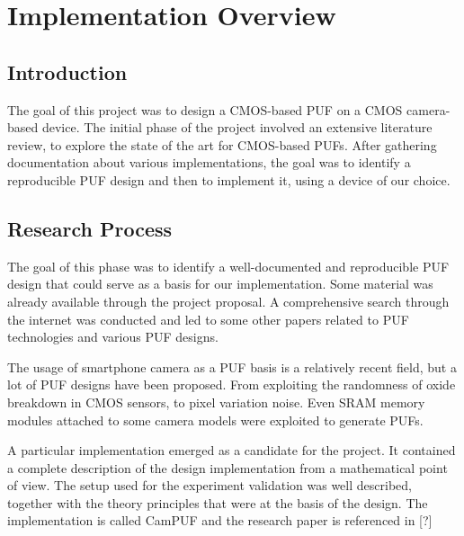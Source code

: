 \chapter{Implementation Overview}
\section{Introduction}
The goal of this project was to design a CMOS-based PUF on a CMOS camera-based device.
The initial phase of the project involved an extensive literature review, to explore the state of the art for CMOS-based PUFs.
After gathering documentation about various implementations, the goal was to identify a reproducible PUF design and then to implement it, using a device of our choice.

\section{Research Process}
The goal of this phase was to identify a well-documented and reproducible PUF design that could serve as a basis for our implementation.
Some material was already available through the project proposal. A comprehensive search through the internet was conducted and led to some other papers
related to PUF technologies and various PUF designs.

The usage of smartphone camera as a PUF basis is a relatively recent field, but a lot of PUF designs have been proposed. From exploiting the randomness of oxide breakdown in CMOS
sensors, to pixel variation noise. Even SRAM memory modules attached to some camera models were exploited to generate PUFs.

A particular implementation emerged as a candidate for the project. It contained a complete description of the design implementation from a mathematical point of view.
The setup used for the experiment validation was well described, together with the theory principles that were at the basis of the design.
The implementation is called CamPUF and the research paper is referenced in [?]


